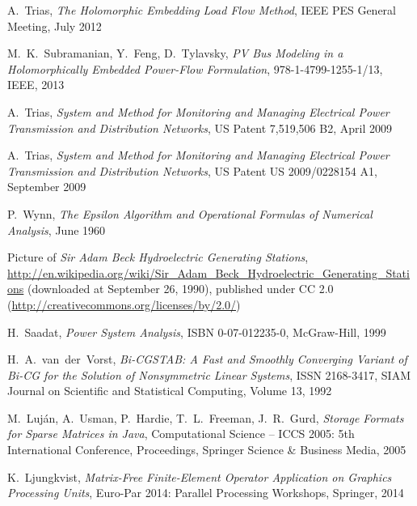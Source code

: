\begin{thebibliography}{1}
	A.~Trias, \emph{The Holomorphic Embedding Load Flow Method}, IEEE PES General Meeting, July 2012
	
	M.~K.~Subramanian, Y.~Feng, D.~Tylavsky, \emph{PV Bus Modeling in a Holomorphically Embedded Power-Flow Formulation}, 978-1-4799-1255-1/13, IEEE, 2013
	
	A.~Trias, \emph{System and Method for Monitoring and Managing Electrical Power Transmission and Distribution Networks}, US Patent 7,519,506 B2, April 2009
	
	A.~Trias, \emph{System and Method for Monitoring and Managing Electrical Power Transmission and Distribution Networks}, US Patent US 2009/0228154 A1, September 2009
				
	P.~Wynn, \emph{The Epsilon Algorithm and Operational Formulas of Numerical Analysis}, June 1960	
	
	Picture of \emph{Sir Adam Beck Hydroelectric Generating Stations}, \url{http://en.wikipedia.org/wiki/Sir_Adam_Beck_Hydroelectric_Generating_Stations} (downloaded at September 26, 1990), published under CC 2.0 (\url{http://creativecommons.org/licenses/by/2.0/})
	
	H.~Saadat, \emph{Power System Analysis}, ISBN 0-07-012235-0, McGraw-Hill, 1999
	
	H.~A.~van~der~Vorst, \emph{Bi-CGSTAB: A Fast and Smoothly Converging Variant of Bi-CG for the Solution of Nonsymmetric Linear Systems}, ISSN 2168-3417, SIAM Journal on Scientific and Statistical Computing, Volume 13, 1992
	
	M.~Luján, A.~Usman, P.~Hardie, T.~L.~Freeman, J.~R.~Gurd, \emph{Storage Formats for Sparse Matrices in Java}, Computational Science -- ICCS 2005: 5th International Conference, Proceedings, Springer Science \& Business Media, 2005
	
	K.~Ljungkvist, \emph{Matrix-Free Finite-Element Operator Application on Graphics Processing Units}, Euro-Par 2014: Parallel Processing Workshops, Springer, 2014
\end{thebibliography}